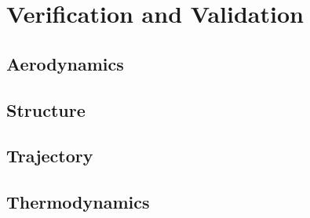 \section{Verification and Validation}

\subsection{Aerodynamics} \label{sec:VandVaero}


\subsection{Structure} \label{sec:VandVstruc}


\subsection{Trajectory} \label{sec:VandVtraj}


\subsection{Thermodynamics} \label{sec:VandVthermo}

